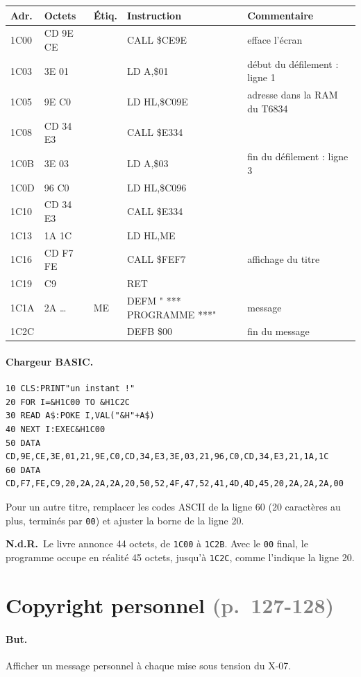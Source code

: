 \documentclass[a4paper,10pt]{article}
\makeatletter
\newcommand{\hex}[1]{\texttt{#1}}
\newcommand{\pg}[1]{\texorpdfstring{\textcolor{gray}{\small(p.~#1)}}{}}
\newcommand{\nota}[1]{\textcolor{red!60!black}{\small\textbf{N.d.R.}~#1}}
\newenvironment{asm}
  {\small\begin{longtable}{@{}>{\ttfamily}l>{\ttfamily}l>{\ttfamily}l>{\ttfamily}l>{\raggedright\arraybackslash}p{6.2cm}@{}}
   \toprule
   \normalfont\bfseries Adr. & \normalfont\bfseries Octets & \normalfont\bfseries Étiq. & \normalfont\bfseries Instruction & \textbf{Commentaire}\\
   \midrule\endhead
   \bottomrule\endfoot}
  {\end{longtable}}
\makeatother
\begin{document}
\begin{asm}
1C00 & CD 9E CE &    & CALL \$CE9E    & efface l'écran \\
1C03 & 3E 01    &    & LD A,\$01      & début du défilement : ligne 1 \\
1C05 & 21 9E C0 &    & LD HL,\$C09E   & adresse dans la RAM du T6834 \\
1C08 & CD 34 E3 &    & CALL \$E334    & \\
1C0B & 3E 03    &    & LD A,\$03      & fin du défilement : ligne 3 \\
1C0D & 21 96 C0 &    & LD HL,\$C096   & \\
1C10 & CD 34 E3 &    & CALL \$E334    & \\
1C13 & 21 1A 1C &    & LD HL,ME       & \\
1C16 & CD F7 FE &    & CALL \$FEF7    & affichage du titre \\
1C19 & C9       &    & RET            & \\
1C1A & 20 2A \dots & ME & DEFM " *** PROGRAMME ***" & message \\
1C2C & 00       &    & DEFB \$00      & fin du message \\
\end{asm}

\paragraph{Chargeur BASIC.}
\begin{verbatim}
10 CLS:PRINT"un instant !"
20 FOR I=&H1C00 TO &H1C2C
30 READ A$:POKE I,VAL("&H"+A$)
40 NEXT I:EXEC&H1C00
50 DATA CD,9E,CE,3E,01,21,9E,C0,CD,34,E3,3E,03,21,96,C0,CD,34,E3,21,1A,1C
60 DATA CD,F7,FE,C9,20,2A,2A,2A,20,50,52,4F,47,52,41,4D,4D,45,20,2A,2A,2A,00
\end{verbatim}
Pour un autre titre, remplacer les codes ASCII de la ligne 60 (20 caractères
au plus, terminés par \hex{00}) et ajuster la borne de la ligne 20.

\nota{Le livre annonce 44 octets, de \hex{1C00} à \hex{1C2B}. Avec le
\hex{00} final, le programme occupe en réalité 45 octets, jusqu'à
\hex{1C2C}, comme l'indique la ligne 20.}

\section{Copyright personnel \pg{127-128}}

\paragraph{But.} Afficher un message personnel à chaque mise sous tension
du X-07.
\end{document}
